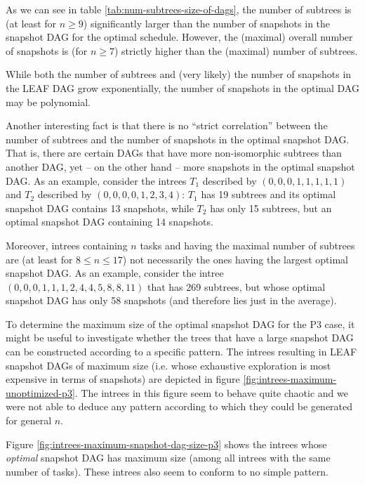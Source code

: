 As we can see in table \ref{tab:num-subtrees-size-of-dags}, the number of subtrees is (at least for $n\geq  9$) significantly larger than the number of snapshots in the snapshot DAG for the optimal schedule. However, the (maximal) overall number of snapshots is (for $n\geq 7$) strictly higher than the (maximal) number of subtrees.

While both the number of subtrees and (very likely) the number of snapshots in the LEAF DAG grow exponentially, the number of snapshots in the optimal DAG may be polynomial. 


Another interesting fact is that there is no ``strict correlation'' between the number of subtrees and the number of snapshots in the optimal snapshot DAG. That is, there are certain DAGs that have more non-isomorphic subtrees than another DAG, yet -- on the other hand -- more snapshots in the optimal snapshot DAG. As an example, consider the intrees $T_1$ described by $(0,0,0,1,1,1,1,1)$ and $T_2$ described by $(0,0,0,0,1,2,3,4)$: $T_1$ has 19 subtrees and its optimal snapshot DAG contains 13 snapshots, while $T_2$ has only 15 subtrees, but an optimal snapshot DAG containing 14 snapshots.

Moreover, intrees containing $n$ tasks and having the maximal number of subtrees are (at least for $8\leq n \leq 17$) not necessarily the ones having the largest optimal snapshot DAG. As an example, consider the intree $(0,0,0,1,1,1,2,4,4,5,8,8,11)$ that has 269 subtrees, but whose optimal snapshot DAG has only 58 snapshots (and therefore lies just in the average).

To determine the maximum size of the optimal snapshot DAG for the P3 case, it might be useful to investigate whether the trees that have a large snapshot DAG can be constructed according to a specific pattern. The intrees resulting in LEAF snapshot DAGs of maximum size (i.e. whose exhaustive exploration is most expensive in terms of snapshots) are depicted in figure \ref{fig:intrees-maximum-unoptimized-p3}. The intrees in this figure seem to behave quite chaotic and we were not able to deduce any pattern according to which they could be generated for general $n$.

Figure \ref{fig:intrees-maximum-snapshot-dag-size-p3} shows the intrees whose \emph{optimal} snapshot DAG has maximum size (among all intrees with the same number of tasks). These intrees also seem to conform to no simple pattern.

